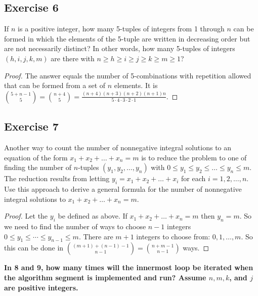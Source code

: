 \documentclass[14pt]{extarticle}
\newcommand{\cy}{\color{cyan}}
\begin{document}
\subsection{Exercise 6}
If \(n\) is a positive integer, how many 5-tuples of integers from 1 through \(n\) can be formed in which the elements of
the 5-tuple are written in decreasing order but are not
necessarily distinct? In other words, how many 5-tuples of
integers \((h, i, j, k, m)\) are there with \(n \geq h \geq i
\geq j \geq k \geq m \geq 1\)?

\begin{proof}
     The answer equals the number of 5-combinations with repetition allowed that can be formed from a set of \(n\) elements. It is
     \(\binom{5+n-1}{5} = \binom{n+4}{5} = \frac{(n+4)(n+3)(n+2)(n+1)n}{5 \cdot 4 \cdot 3 \cdot 2 \cdot 1}\).
\end{proof}

\subsection{Exercise 7}
Another way to count the number of nonnegative integral solutions to an equation of the form \(x_1 + x_2 + \ldots +
x_n = m\) is to reduce the problem to one of finding the number of \(n\)-tuples \((y_1, y_2, \ldots, y_n)\) with
\(0 \leq y_1 \leq y_2 \leq \ldots \leq y_n \leq m\). The reduction results from letting \(y_i = x_1 + x_2 + \ldots +
x_i\) for each \(i = 1, 2, \ldots, n\). Use this approach to derive a general formula for the number of nonnegative
integral solutions to \(x_1 + x_2 + \ldots + x_n = m\).

\begin{proof}
     Let the \(y_i\) be defined as above. If \(x_1 + x_2 + \ldots + x_n = m\) then \(y_n = m\). So we need to find the number of
     ways to choose \(n-1\) integers \(0 \leq y_1 \leq \cdots \leq y_{n-1} \leq m\). There are \(m+1\) integers to choose from:
     \(0, 1, \ldots, m\). So this can be done in \(\binom{(m+1) + (n-1) - 1}{n-1} = \binom{n+m-1}{n-1}\) ways.
\end{proof}

{\bf \cy In 8 and 9, how many times will the innermost loop be iterated when the algorithm segment is implemented and run?
Assume \(n, m, k\), and \(j\) are positive integers.}
\end{document}
